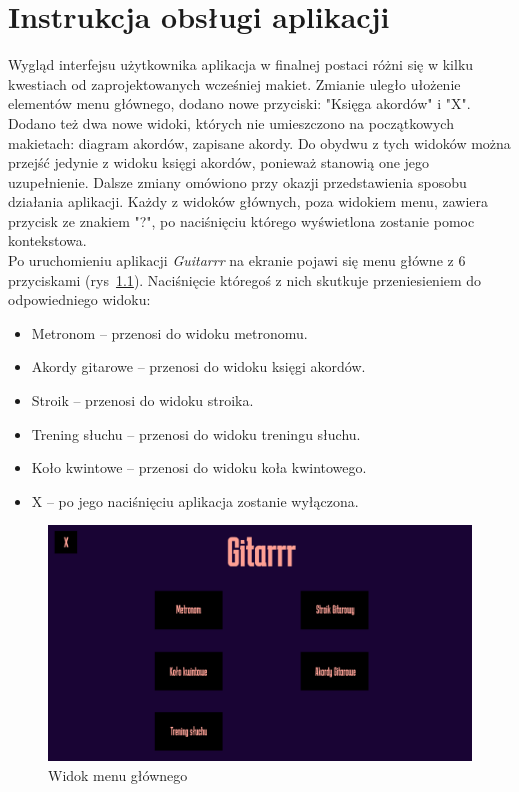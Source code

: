 \chapter{Instrukcja obsługi aplikacji}
Wygląd interfejsu użytkownika aplikacja w finalnej postaci różni się w kilku kwestiach od zaprojektowanych wcześniej makiet. Zmianie uległo ułożenie elementów menu głównego, dodano nowe przyciski: "Księga akordów" i "X". Dodano też dwa nowe widoki, których nie umieszczono na początkowych makietach: diagram akordów, zapisane akordy. Do obydwu z tych widoków można przejść jedynie z widoku księgi akordów, ponieważ stanowią one jego uzupełnienie. Dalsze zmiany omówiono przy okazji przedstawienia sposobu działania aplikacji. Każdy z widoków głównych, poza widokiem menu, zawiera przycisk ze znakiem "?", po naciśnięciu którego wyświetlona zostanie pomoc kontekstowa. \\[-10pt]

Po uruchomieniu aplikacji \emph{Guitarrr} na ekranie pojawi się menu główne z 6 przyciskami (rys~\ref{fig:Menu}). Naciśnięcie któregoś z nich skutkuje przeniesieniem do odpowiedniego widoku:
\begin{itemize}
    \item Metronom -- przenosi do widoku metronomu.
    \item Akordy gitarowe -- przenosi  do widoku księgi akordów.
    \item Stroik -- przenosi  do widoku stroika.
    \item Trening słuchu -- przenosi  do widoku treningu słuchu.
    \item Koło kwintowe -- przenosi do widoku koła kwintowego.
    \item X -- po jego naciśnięciu aplikacja zostanie wyłączona.
\end{itemize}
\begin{figure}[htb]
	\centering
	\includegraphics[width=.7\linewidth]{rysB/MenuG}
	\caption{Widok menu głównego} \label{fig:Menu}
\end{figure}

